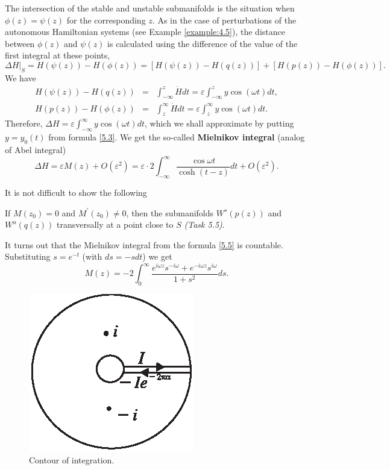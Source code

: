 \begin{example}
	The intersection of the stable and unstable submanifolds is the situation when $\phi (z)=\psi (z)$ for the corresponding $z$. As in the case of perturbations of the autonomous Hamiltonian systems (see Example \ref{example:4.5}), the distance between $\phi (z)$ and $\psi (z)$ is calculated using the difference of the value of the first integral at these points,
	$$
	\Delta H|_{S}=H(\psi (z))-H(\phi (z))=\left[ H(\psi (z))-H(q(z))\right]
	+\left[ H(p(z))-H(\phi (z))\right] .
	$$
	We have
	$$
	\begin{array}{lll}
	H(\psi (z))-H(q(z)) &=&\int_{-\infty }^{z}\dot{H}dt=\varepsilon \int_{-\infty
	}^{z}y\cos \left( \omega t\right) dt, \\
	H(p(z))-H(\phi (z)) &=&\int_{z}^{\infty }\dot{H}dt=\varepsilon
	\int_{z}^{\infty }y\cos \left( \omega t\right) dt.
	\end{array}
	$$
	Therefore, $\Delta H=\varepsilon \int_{-\infty }^{\infty } y\cos \left( \omega t\right) dt$, which we shall approximate by putting $y=y_{0}(t)$ from formula \eqref{5.3}. We get the so-called \textbf{Mielnikov integral} (analog of Abel integral)
	\begin{equation}
	\label{5.5}
	\Delta H=\varepsilon M(z)+O(\varepsilon ^{2})=\varepsilon \cdot
	2\int_{-\infty }^{\infty }\frac{\cos \omega t}{\cosh (t-z)}dt+O(\varepsilon
	^{2}).
	\end{equation}
\end{example}

It is not difficult to show the following
\begin{lemma}\label{lemma:5.3}
	If $M\left( z_{0}\right) =0$ and $M^{\prime }(z_{0})\not=0$, then the submanifolds $W^{s}(p(z))$ and $W^{u}(q(z))$ transversally at a point close to $S$ \emph{(Task 5.5)}.
\end{lemma}

It turns out that the Mielnikov integral from the formula \eqref{5.5} is countable. Substituting $s=e^{-t}$ (with $ds=-sdt$) we get
$$
M(z)=-2\int_{0}^{\infty }\frac{e^{i\omega z}s^{-i \omega}+e^{-i\omega z}s^{i\omega }}{1+s^{2}}ds.
$$
\begin{figure}[!ht]
	\centering
	\includegraphics [scale=2]{jtr57}
	\caption{Contour of integration.}
	\label{fig:5.7}
\end{figure}


